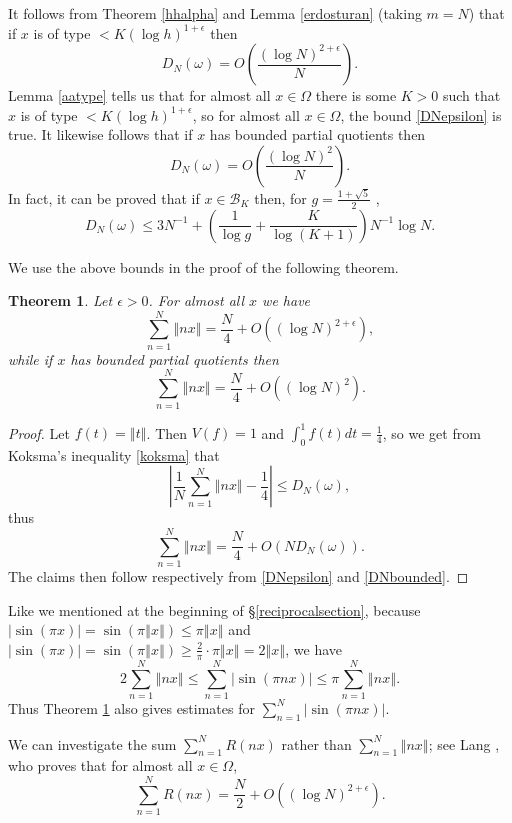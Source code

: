 \documentclass{article}
\newcommand{\norm}[1]{\left\Vert #1 \right\Vert}
\newtheorem{theorem}{Theorem}
\begin{document}
It follows from Theorem \ref{hhalpha} and Lemma \ref{erdosturan} (taking $m=N$) that if $x$ is of type $<K(\log h)^{1+\epsilon}$ then
\begin{equation}
D_N(\omega)=O\left( \frac{(\log N)^{2+\epsilon}}{N} \right).
\label{DNepsilon}
\end{equation}
Lemma \ref{aatype} tells us that for  almost all $x \in \Omega$ there is some $K>0$ such that $x$ is of type $<K(\log h)^{1+\epsilon}$, so for almost
all $x \in \Omega$, the bound \eqref{DNepsilon} is true. 
It likewise  follows that if $x$ has bounded partial quotients then 
\begin{equation}
D_N(\omega)=O\left( \frac{(\log N)^2}{N} \right).
\label{DNbounded}
\end{equation}
In fact, it can be proved that if $x \in \mathcal{B}_K$ then, for $g = \frac{1+\sqrt{5}}{2}$ \cite[p.~125, Theorem 3.4]{kuipers},
\[
D_N(\omega) \leq  3N^{-1} + \left( \frac{1}{\log g} + \frac{K}{\log(K+1)} \right) N^{-1} \log N.
\]




We use the above bounds in the proof of the following theorem.

\begin{theorem}
Let $\epsilon>0$. For almost all $x$ we have
\[
\sum_{n=1}^N \norm{nx}=\frac{N}{4}+O((\log N)^{2+\epsilon}),
\]
while if $x$ has bounded partial quotients then
\[
\sum_{n=1}^N \norm{nx}=\frac{N}{4}+O((\log N)^2).
\]
\label{normsum}
\end{theorem}
\begin{proof}
Let $f(t)=\norm{t}$. Then $V(f)=1$ and $\int_0^1 f(t) dt=\frac{1}{4}$, so we get from Koksma's inequality \eqref{koksma} that
\[
\left| \frac{1}{N} \sum_{n=1}^N \norm{nx} - \frac{1}{4} \right| \leq D_N(\omega),
\]
thus
\[
\sum_{n=1}^N \norm{nx}=\frac{N}{4}+O(ND_N(\omega)).
\]
The claims then follow respectively from \eqref{DNepsilon} and \eqref{DNbounded}.
\end{proof}

Like we mentioned at the beginning of \S \ref{reciprocalsection},
because $|\sin(\pi x)|=\sin(\pi \norm{x}) \leq \pi \norm{x}$ and $|\sin(\pi x)| = \sin(\pi \norm{x}) \geq \frac{2}{\pi} \cdot \pi \norm{x}=2\norm{x}$, we have
\[
2\sum_{n=1}^N \norm{nx} \leq   \sum_{n=1}^N |\sin(\pi nx)|  \leq \pi \sum_{n=1}^N \norm{nx}.
\]
Thus Theorem \ref{normsum} also gives estimates for  $\sum_{n=1}^N |\sin(\pi nx)|$.

We can investigate the sum $\sum_{n=1}^N R(nx)$ rather than $\sum_{n=1}^N \norm{nx}$; see Lang \cite[p.~37, Theorem 1]{MR0209227}, who proves that
for almost all $x \in \Omega$,
\[
\sum_{n=1}^N R(nx)=\frac{N}{2}+O((\log N)^{2 + \epsilon}).
\]
\end{document}
